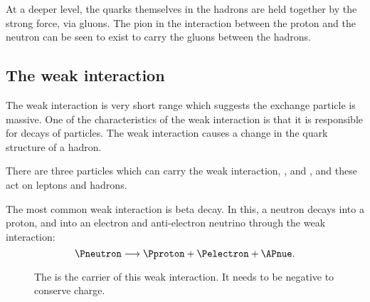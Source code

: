 \begin{marginfigure}
\caption{At a deeper level, the quarks themselves in the hadrons are held together by the strong force, via gluons.  The pion in the interaction between the proton and the neutron can be seen to exist to carry the gluons between the hadrons.}
\end{marginfigure}

\subsection{The weak interaction}

The weak interaction is very short range which suggests the exchange particle is massive.  One of the characteristics of the weak interaction is that it is responsible for decays of particles.  The weak interaction causes a change in the quark structure of a hadron.

There are three particles which can carry the weak interaction, \PWplus, \PWminus and \PZzero, and these act on leptons and hadrons.

The most common weak interaction is beta decay.  In this, a neutron decays into a proton, and into an electron and anti-electron neutrino through the weak interaction:
\[\Pneutron\longrightarrow\Pproton+\Pelectron+\APnue.\]

\begin{figure}
\caption{The \PWminus is the carrier of this weak interaction.  It needs to be negative to conserve charge.}
\end{figure}

